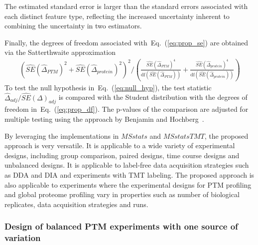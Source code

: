 \documentclass[mcp]{article}
\numberwithin{table}{section}
\def\eqref#1{Eq.~(\ref{eq:#1})}
\begin{document}
The estimated standard error is larger than the standard errors associated with each distinct feature type, reflecting the increased uncertainty inherent to combining the uncertainty in two estimators. 

Finally, the degrees of freedom associated with~\eqref{prop_se} are obtained via the Satterthwaite approximation~\cite{kutner_etal_04a, satterthwaite:1946}
\begin{eqnarray}
\left( \widehat{SE}(\hat{\Delta}_{PTM})^{2} + \widehat{SE}(\hat{\Delta}_{protein})^{2} \right)^2 \bigg/
\left( \frac{\widehat{SE}(\hat{\Delta}_{PTM})^{4}}{\mathrm{df}(\widehat{SE}(\hat{\Delta}_{PTM}))} + \frac{\widehat{SE}(\hat{\Delta}_{protein})^{4}}{ \mathrm{df}(\widehat{SE}(\hat{\Delta}_{protein}))} \right)
\label{eq:prop_df}
\end{eqnarray}
To test the null hypothesis in~\eqref{null_hyp}, the test statistic $\hat{\Delta}_{adj}/\widehat{SE}(\Delta)_{adj}$ is compared with the Student distribution with the degrees of freedom in~\eqref{prop_df}. The p-values of the comparison are adjusted for multiple testing using the approach by Benjamin and Hochberg~\cite{Benjamini:1995}.


By leveraging the implementations in $MSstats$ and $MSstatsTMT$, the proposed approach is very versatile. It is applicable to a wide variety of experimental designs, including group comparison, paired designs, time course designs and unbalanced designs. It is applicable to label-free data acquisition strategies such as DDA and DIA and experiments with TMT labeling. The proposed approach is also applicable to experiments where the experimental designs for PTM profiling and global proteome profiling vary in properties such as number of biological replicates, data acquisition strategies and runs.


\subsubsection*{Design of balanced PTM experiments with one source of variation}
\label{sec:design}
\end{document}
